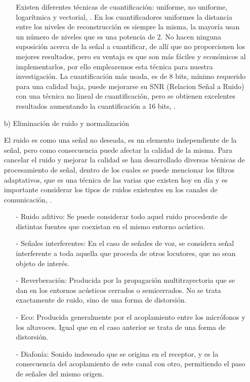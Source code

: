 \begin{enumerate}
\begin{enumerate}
Existen diferentes técnicas de cuantificación: uniforme, no uniforme, logarítmica y vectorial, \cite{rama}. En los cuantificadores uniformes la distancia entre los niveles de reconstrucción es siempre la misma, la mayoría usan un número de niveles que es una potencia de 2. No hacen ninguna suposición acerca de la señal a cuantificar, de allí que no proporcionen los mejores resultados, pero su ventaja es que son más fáciles y económicos al implementarlos, por ello emplearemos esta técnica para nuestra investigación.
\vskip 0.5cm
La cuantificación más usada, es de 8 bits, mínimo requerido para una calidad baja, puede mejorarse su SNR (Relacion Señal a Ruido) con una técnica no lineal de cuantificación, pero se obtienen excelentes resultados aumentando la cuantificación a 16 bits, \cite{kaifu}.
\end{enumerate}

\item[b)]Eliminación de ruido y normalización
\par
El ruido es como una señal no deseada, es un elemento independiente de la señal, pero como consecuencia puede afectar la calidad de la misma. Para cancelar el ruido y mejorar la calidad se han desarrollado diversas técnicas de procesamiento de señal, dentro de los cuales se puede mencionar los filtros adaptativos, que es una técnica de las varias que existen hoy en día y es importante considerar los tipos de ruidos existentes en los canales de comunicación, \cite{henry}.

\begin{enumerate}
\item[-]Ruido aditivo: Se puede considerar todo aquel ruido procedente de distintas fuentes que coexistan en el mismo entorno acústico.
\item[-]Señales interferentes: En el caso de señales de voz, se considera señal interferente a toda aquella que proceda de otros locutores, que no sean objeto de interés.
\item[-]Reverberación: Producida por la propagación multitrayectoria que se dan en los entornos acústicos cerrados o semicerrados. No se trata exactamente de ruido, sino de una forma de distorsión.
\item[-]Eco: Producida generalmente por el acoplamiento entre los micrófonos y los altavoces. Igual que en el caso anterior se trata de una forma de distorsión.
\item[-]Diafonía: Sonido indeseado que se origina en el receptor, y es la consecuencia del acoplamiento de este canal con otro, permitiendo el paso de señales del mismo origen.
\end{enumerate}


\end{enumerate}
